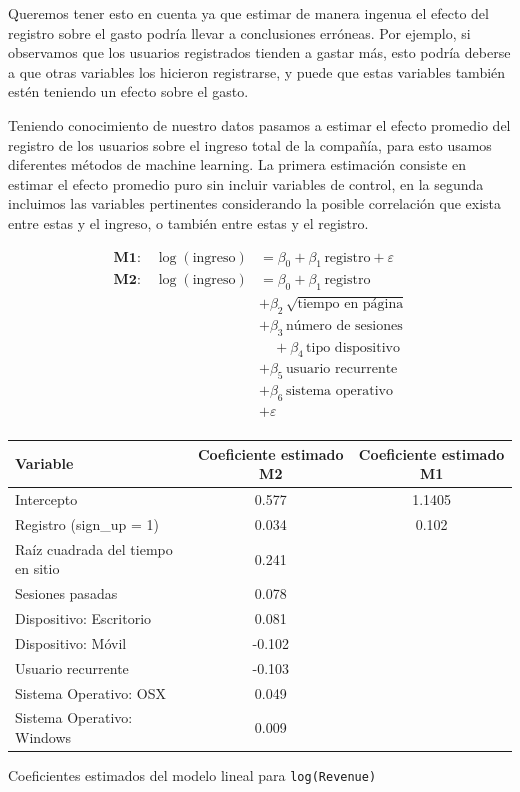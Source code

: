 \documentclass[conference]{IEEEtran}
\begin{document}
Queremos tener esto en cuenta ya que estimar de manera ingenua el efecto del registro sobre el gasto podría llevar a conclusiones erróneas.
Por ejemplo, si observamos que los usuarios registrados tienden a gastar más, esto podría deberse a que otras variables los hicieron registrarse, y puede que estas variables también
estén teniendo un efecto sobre el gasto.


Teniendo conocimiento de nuestro datos pasamos a estimar el efecto promedio del registro de los usuarios sobre el ingreso total de la compañía, 
para esto usamos diferentes métodos de machine learning. La primera estimación consiste en estimar el efecto promedio puro sin incluir variables de control, en la segunda incluimos las variables pertinentes considerando
 la posible correlación que exista entre estas y el ingreso, o también entre estas y el registro.

 \begin{align*}
\textbf{M1:} \quad \log(\text{ingreso}) 
  &= \beta_{0} + \beta_{1}\,\text{registro} + \varepsilon \\[1em]
\textbf{M2:} \quad \log(\text{ingreso}) 
  &= \beta_{0} + \beta_{1}\,\text{registro} \\
     &+ \beta_{2}\,\sqrt{\text{tiempo en página}}\\
     &+ \beta_{3}\,\text{número de sesiones} \\
  &\quad + \beta_{4}\,\text{tipo dispositivo}\\
     &+ \beta_{5}\,\text{usuario recurrente}\\
     &+ \beta_{6}\,\text{sistema operativo}\\
     &+ \varepsilon \\
\end{align*}

\begin{table}[H]
\ssmall
\centering
\begin{tabular}{l c c}
\hline
\textbf{Variable} & \textbf{Coeficiente estimado M2} & \textbf{Coeficiente estimado M1} \\
\hline
Intercepto                 & 0.577  & 1.1405 \\
Registro (sign\_up = 1)     & 0.034 & 0.102 \\
Raíz cuadrada del tiempo en sitio & 0.241 &  \\
Sesiones pasadas            & 0.078 & \\
Dispositivo: Escritorio     & 0.081 & \\
Dispositivo: Móvil          & -0.102 & \\
Usuario recurrente          & -0.103 & \\
Sistema Operativo: OSX      & 0.049 & \\
Sistema Operativo: Windows  & 0.009 & \\
\hline
\end{tabular}

\hfill \break
Coeficientes estimados del modelo lineal para \texttt{log(Revenue)}
\end{table}
\end{document}
